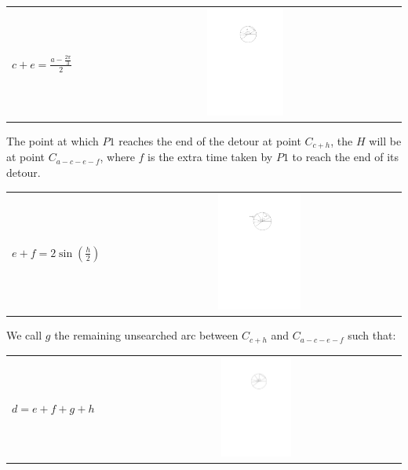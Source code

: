 \documentclass[11pt]{article}
\begin{document}
\begin{flushleft}
    \begin{tabularx}{\textwidth}{lXc}
        \multirow{2}{*}{$c+e = \frac{a - \frac{2\pi}{3}}{2}$} & &  \parbox[c]{0.25\textwidth}{\includegraphics[width=0.25\textwidth]{Q2S1_Eq/eq_4.pdf}} \\
    \end{tabularx}

    The point at which $P1$ reaches the end of the detour at point $C_{c + h}$,
    the $H$ will be at point $C_{a - c - e - f}$, where $f$ is the extra time
    taken by $P1$ to reach the end of its detour.

    \begin{tabularx}{\textwidth}{lXc}
        \multirow{2}{*}{$e+f = 2\sin(\frac{h}{2})$} & & \parbox[c]{0.3\textwidth}{\includegraphics[width=0.3\textwidth]{Q2S1_Eq/eq_5.pdf}} \\
    \end{tabularx}

    We call $g$ the remaining unsearched arc between $C_{c + h}$ and $C_{a - c - e - f}$
    such that:

    \begin{tabularx}{\textwidth}{lXc}
        \multirow{2}{*}{$d = e+f+g+h$} & & \parbox[c]{0.25\textwidth}{\includegraphics[width=0.25\textwidth]{Q2S1_Eq/eq_3.pdf}} \\
    \end{tabularx}


\end{flushleft}
\end{document}
